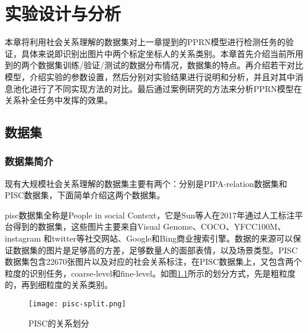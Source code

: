 
\chapter{实验设计与分析}
\label{ch:exp}

本章将利用社会关系理解的数据集对上一章提到的PPRN模型进行检测任务的验证，具体来说即识别出图片中两个标定坐标人的关系类别。本章首先介绍当前所用到的两个数据集训练/验证/测试的数据分布情况，数据集的特点。再介绍若干对比模型，介绍实验的参数设置，然后分别对实验结果进行说明和分析，并且对其中消息池化进行了不同实现方法的对比。最后通过案例研究的方法来分析PPRN模型在关系补全任务中发挥的效果。

\section{数据集}

\subsection{数据集简介}

现有大规模社会关系理解的数据集主要有两个：分别是PIPA-relation\cite{sun2017a}数据集和PISC\cite{li2017dual-glance}数据集，下面简单介绍这两个数据集。

pisc数据集全称是People in social Context，它是Sun等人\cite{sun2017a}在2017年通过人工标注平台得到的数据集，这些图片主要来自Visual Genome\cite{krishna2017visual}、COCO\cite{lin2014microsoft}、YFCC100M\cite{thomee2016yfcc100m:}、instagram 和twitter等社交网站、Google和Bing商业搜索引擎。数据的来源可以保证数据集的图片是足够高的方差，足够数量人的面部表情，以及场景类型。PISC数据集包含22670张图片以及对应的社会关系标注，在PISC数据集上，又包含两个粒度的识别任务，coarse-level和fine-level。如图\ref{fig:exp-pisc-r}所示的划分方式，先是粗粒度的，再到细粒度的关系类别。
\begin{figure}[htpb]
	\centering
	\texttt{[image: pisc-split.png]}
    \caption{PISC的关系划分}
	\vspace*{-3.5mm}
	\label{fig:exp-pisc-r}
\end{figure}

